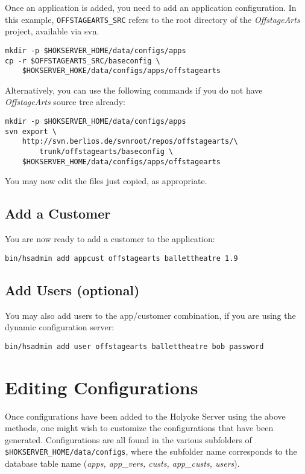 \documentclass[11pt]{article}
\begin{document}
\begin{enumerate}
Once an application is added, you need to add an application configuration.  In this example, {\tt OFFSTAGEARTS\_SRC} refers to the root directory of the \emph{OffstageArts} project, available via svn.
\begin{verbatim}
mkdir -p $HOKSERVER_HOME/data/configs/apps
cp -r $OFFSTAGEARTS_SRC/baseconfig \
    $HOKSERVER_HOKE/data/configs/apps/offstagearts
\end{verbatim}

Alternatively, you can use the following commands if you do not have \emph{OffstageArts} source tree already:

\begin{verbatim}
mkdir -p $HOKSERVER_HOME/data/configs/apps
svn export \
    http://svn.berlios.de/svnroot/repos/offstagearts/\
        trunk/offstagearts/baseconfig \
    $HOKSERVER_HOME/data/configs/apps/offstagearts
\end{verbatim}

You may now edit the files just copied, as appropriate.

\subsection{Add a Customer}

You are now ready to add a customer to the application:
\begin{verbatim}
bin/hsadmin add appcust offstagearts ballettheatre 1.9
\end{verbatim}

\subsection{Add Users (optional)}

You may also add users to the app/customer combination, if you are using the dynamic configuration server:
\begin{verbatim}
bin/hsadmin add user offstagearts ballettheatre bob password
\end{verbatim}

\section{Editing Configurations}

Once configurations have been added to the Holyoke Server using the above methods, one might wish to customize the configurations that have been generated.  Configurations are all found in the various subfolders of {\tt \$HOKSERVER\_HOME/data/configs}, where the subfolder name corresponds to the database table name (\emph{apps, app\_vers, custs, app\_custs, users}).


\end{enumerate}
\end{document}
